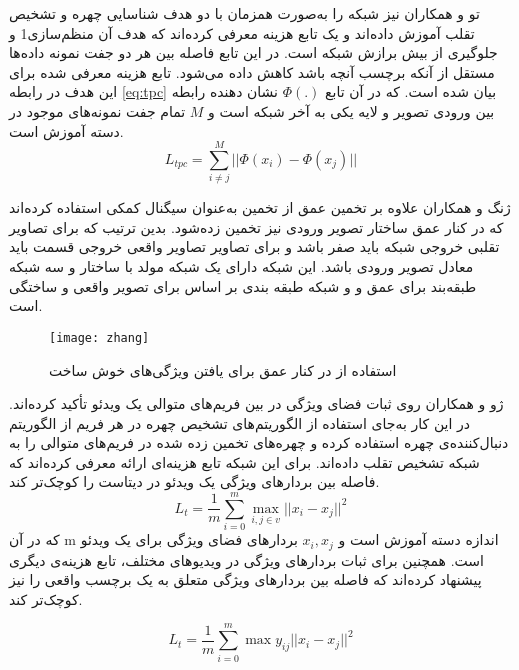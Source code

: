 تو و همکاران
\cite{tu2020learning}
 نیز شبکه  را به‌صورت همزمان با دو هدف شناسایی چهره و تشخیص تقلب آموزش داده‌اند و یک تابع هزینه معرفی کرده‌اند که هدف آن منظم‌سازی1 و جلوگیری از بیش برازش شبکه است. در این تابع فاصله بین هر دو جفت نمونه داده‌ها مستقل از آنکه برچسب آنچه باشد کاهش داده می‌شود. تابع هزینه معرفی شده برای این هدف در رابطه
\ref{eq:tpc}
 بیان شده است. که در آن تابع 
 $\Phi(.)$
  نشان دهنده رابطه بین ورودی تصویر و لایه یکی به آخر شبکه است و $M$ تمام جفت نمونه‌های موجود در دسته آموزش است. 
  \begin{equation}\label{eq:tpc}
 	L_{tpc}=\sum_{i\ne j}^{M}||\Phi(x_i)-\Phi(x_j)||
 \end{equation}

ژنگ و همکاران
\cite{zhang2020face}
علاوه بر تخمین عمق از تخمین  به‌عنوان سیگنال کمکی استفاده کرده‌اند که در کنار عمق ساختار  تصویر ورودی نیز تخمین زده‌شود. بدین ترتیب که برای تصاویر تقلبی خروجی  شبکه باید صفر باشد و برای تصاویر تصاویر واقعی خروجی قسمت  باید معادل  تصویر ورودی باشد. این شبکه دارای یک شبکه مولد با ساختار  و سه شبکه طبقه‌بند برای عمق و  و شبکه طبقه بندی بر اساس  برای تصویر واقعی و ساختگی است.
 \begin{figure}[h]
	\centerline{\texttt{[image: zhang]}}
	\caption{استفاده از  در کنار عمق برای یافتن ویژگی‌های خوش ساخت \cite{zhang2020face} }
	\label{fig:zhang}
\end{figure}

ژو و همکاران
\cite{xu2021improving}
روی ثبات فضای ویژگی در بین فریم‌های متوالی یک ویدئو تأکید کرده‌اند. در این کار به‌جای استفاده از الگوریتم‌های تشخیص چهره در هر فریم از الگوریتم دنبال‌کننده‌ی چهره استفاده کرده و چهره‌های تخمین زده شده در فریم‌های متوالی را به شبکه تشخیص تقلب داده‌اند. برای این شبکه تابع هزینه‌ای ارائه معرفی کرده‌اند که فاصله بین بردارهای ویژگی یک ویدئو در دیتاست را کوچک‌تر کند. 
  \begin{equation}\label{eq:xult}
	L_{t}=\frac{1}{m}\sum_{i=0}^{m}\max_{i,j \in v}{||x_i-x_j||^2}
\end{equation}
که در آن m اندازه دسته آموزش است و
$x_i,x_j$
بردارهای فضای ویژگی برای یک ویدئو است. همچنین برای ثبات بردارهای ویژگی در ویدیوهای مختلف، تابع هزینه‌ی دیگری پیشنهاد کرده‌اند که فاصله بین بردارهای ویژگی متعلق به یک برچسب واقعی را نیز کوچک‌تر کند.

  \begin{equation}\label{eq:xule}
	L_{t}=\frac{1}{m}\sum_{i=0}^{m}\max{y_{ij}||x_i-x_j||^2}
\end{equation}

